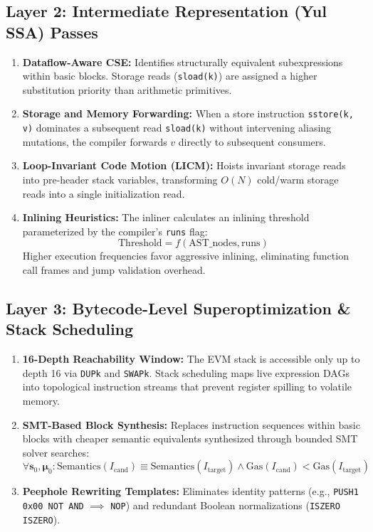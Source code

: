 \documentclass[conference]{IEEEtran}
\begin{document}
\subsection{Layer 2: Intermediate Representation (Yul SSA) Passes}
\begin{enumerate}
    \item \textbf{Dataflow-Aware CSE:} Identifies structurally equivalent subexpressions within basic blocks. Storage reads (\texttt{sload(k)}) are assigned a higher substitution priority than arithmetic primitives.
    \item \textbf{Storage and Memory Forwarding:} When a store instruction \texttt{sstore(k, v)} dominates a subsequent read \texttt{sload(k)} without intervening aliasing mutations, the compiler forwards $v$ directly to subsequent consumers.
    \item \textbf{Loop-Invariant Code Motion (LICM):} Hoists invariant storage reads into pre-header stack variables, transforming $O(N)$ cold/warm storage reads into a single initialization read.
    \item \textbf{Inlining Heuristics:} The inliner calculates an inlining threshold parameterized by the compiler's \texttt{runs} flag:
    \begin{equation}
    \text{Threshold} = f(\text{AST\_nodes}, \text{runs})
    \end{equation}
    Higher execution frequencies favor aggressive inlining, eliminating function call frames and jump validation overhead.
\end{enumerate}

\subsection{Layer 3: Bytecode-Level Superoptimization \& Stack Scheduling}
\begin{enumerate}
    \item \textbf{16-Depth Reachability Window:} The EVM stack is accessible only up to depth 16 via \texttt{DUPk} and \texttt{SWAPk}. Stack scheduling maps live expression DAGs into topological instruction streams that prevent register spilling to volatile memory.
    \item \textbf{SMT-Based Block Synthesis:} Replaces instruction sequences within basic blocks with cheaper semantic equivalents synthesized through bounded SMT solver searches:
    \begin{equation}
    \forall \mathbf{s}_0, \boldsymbol{\mu}_0: \text{Semantics}(I_{\text{cand}}) \equiv \text{Semantics}(I_{\text{target}}) \land \text{Gas}(I_{\text{cand}}) < \text{Gas}(I_{\text{target}})
    \end{equation}
    \item \textbf{Peephole Rewriting Templates:} Eliminates identity patterns (e.g., \texttt{PUSH1 0x00 NOT AND} $\implies$ \texttt{NOP}) and redundant Boolean normalizations (\texttt{ISZERO ISZERO}).
\end{enumerate}
\end{document}
